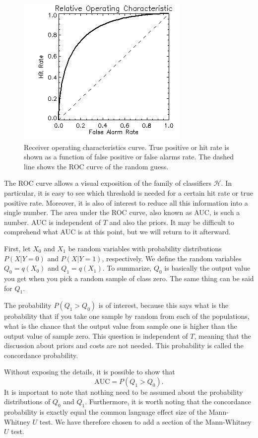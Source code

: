 \begin{figure}[ht!]
\centering
\includegraphics[scale=0.70]{fig/ROC}
\caption{\label{fig:ROC}Receiver operating characteristics curve.  True positive or hit rate is shown as a function of false positive or false alarms rate.  The dashed line shows the ROC curve of the random guess.}
\end{figure}


The ROC curve allows a visual exposition of the family of classifiers $\mathcal{H}$.  In particular, it is easy to see which threshold is needed for a certain hit rate or true positive rate.  Moreover, it is also of interest to reduce all this information into a single number.  The area under the ROC curve, also known as AUC, is such a number.  
AUC is independent of $T$ and also the priors.  It may be difficult to comprehend what AUC is at this point, but we will return to it afterward.

First, let $X_0$ and $X_1$ be random variables with probability distributions $P(X | Y = 0)$ and $P(X | Y = 1)$, respectively.  We define the random variables $Q_0 = q(X_0)$ and $Q_1 = q(X_1)$.  To summarize, $Q_0$ is basically the output value you get when you pick a random sample of class zero. The same thing can be said for $Q_1$.  

The probability $P(Q_1 > Q_0)$ is of interest, because this says what is the probability that if you take one sample by random from each of the populations, what is the chance that the output value from sample one is higher than the output value of sample zero.  This question is independent of $T$, meaning that the discussion about priors and costs are not needed. This probability is called the concordance probability.

Without exposing the details, it is possible to show that
\begin{equation}
\label{eq:concurrent}
\mbox{AUC} = P(Q_1 > Q_0).
\end{equation}
It is important to note that nothing need to be assumed about the probability distributions of $Q_0$ and $Q_1$.  Furthermore, it is worth noting that the concordance probability is exactly equal the common language effect size of the Mann-Whitney $U$ test.  We have therefore chosen to add a section of the Mann-Whitney $U$ test.

